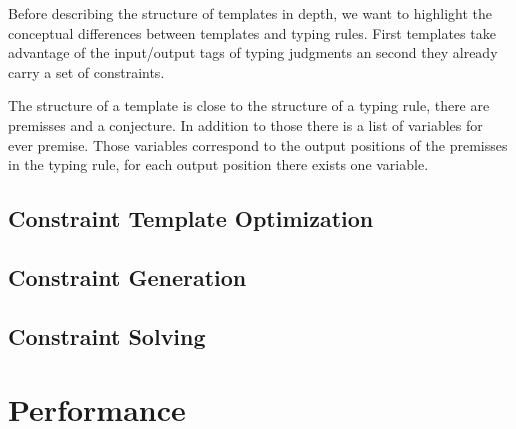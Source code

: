 Before describing the structure of templates in depth, we want to
highlight the conceptual differences between templates and typing
rules. First templates take advantage of the input/output tags of
typing judgments an second they already carry a set of constraints.

The structure of a template is close to the structure of a typing
rule, there are premisses and a conjecture. In addition to those there
is a list of variables for ever premise. Those variables correspond to
the output positions of the premisses in the typing rule, for each
output position there exists one variable. 

\subsection{Constraint Template Optimization}
\label{sec:constr-templ-optim}
\subsection{Constraint Generation}
\label{sec:constr-gener}
\subsection{Constraint Solving}
\label{sec:constraint-solving}
\section{Performance}
\label{sec:performance}

